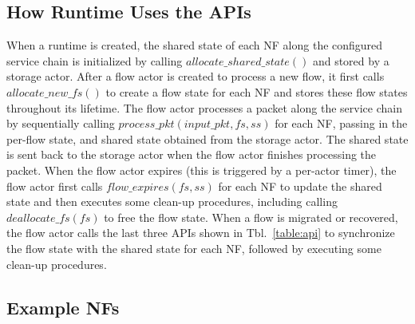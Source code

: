 
\subsection{How Runtime Uses the APIs}

When a runtime is created, the shared state of each NF along the configured service chain is initialized by calling $allocate\_shared\_state()$ and stored by a storage actor. After a flow actor is created to process a new flow, it first calls $allocate\_new\_fs()$ to create a flow state for each NF and stores these flow states throughout its lifetime. The flow actor processes a packet along the service chain by sequentially calling $process\_pkt(input\_pkt, fs, ss)$ for each NF, passing in the per-flow state, and shared state obtained from the storage actor. The shared state is sent back to the storage actor when the flow actor finishes processing the packet. When the flow actor expires (this is triggered by a per-actor timer), the flow actor first calls $flow\_expires(fs, ss)$ for each NF to update the shared state and then executes some clean-up procedures, including calling $deallocate\_fs(fs)$ to free the flow state. When a flow is migrated or recovered, the flow actor calls the last three APIs shown in Tbl.~\ref{table:api} to synchronize the flow state with the shared state for each NF, followed by executing some clean-up procedures.

\subsection {Example NFs}

